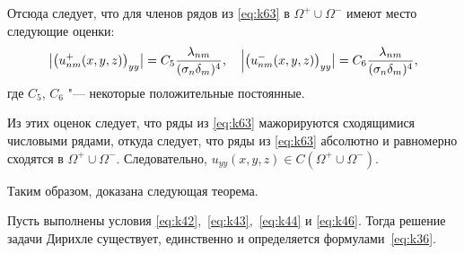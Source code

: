 	Отсюда следует, что для членов рядов из \eqref{eq:k63} в $\Omega^+\cup\Omega^-$ имеют место следующие оценки:
	$$
\bigl|\bigl( u^+_{nm}(x,y,z)\bigr)_{yy}\bigr|  = C_5\frac{\lambda _{nm}}{(\sigma_n\delta_m)^4},\quad
\Bigl|\bigl( u^-_{nm}(x,y,z)\bigr)_{yy}\bigr|  = C_6\frac{\lambda _{nm}}{(\sigma_n\delta_m)^4},
$$
где $C_5$, $C_6$ "--- некоторые положительные постоянные.

Из этих оценок следует, что ряды из \eqref{eq:k63} мажорируются сходящимися числовыми рядами, откуда следует, что ряды из \eqref{eq:k63}  абсолютно и равномерно сходятся в $\Omega^+\cup\Omega^-.$ 
Следовательно, $u_{yy}(x,y,z)\in C(\Omega^+\cup\Omega^-).$

Таким образом, доказана следующая теорема.

\smallskip

\begin{theorem}[2] Пусть выполнены условия \eqref{eq:k42}$,$ \eqref{eq:k43}$,$ \eqref{eq:k44} и \eqref{eq:k46}$.$ Тогда решение задачи Дирихле существует, единственно и определяется формулами~\eqref{eq:k36}$.$
\end{theorem}


